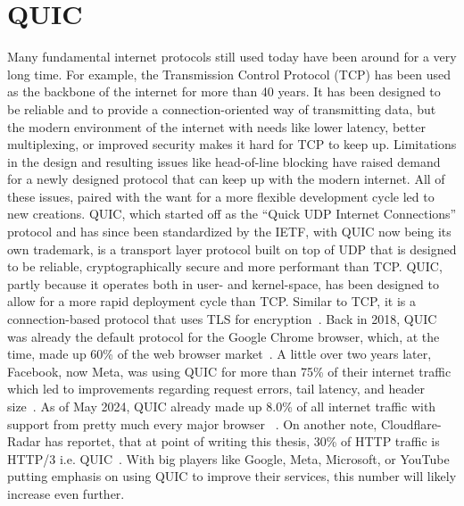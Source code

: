 \section{QUIC}\label{sec:quic_bg}
Many fundamental internet protocols still used today have been around for 
a very long time.
For example, the Transmission Control Protocol (TCP) has been used as the backbone
of the internet for more than 40 years.
It has been designed to be reliable and to provide a connection-oriented
way of transmitting data, but the modern environment of the internet with
needs like lower latency, better multiplexing, or improved security makes it 
hard for TCP to keep up.
Limitations in the design and resulting issues like head-of-line blocking
have raised demand for a newly designed protocol that can keep up with the
modern internet. %
All of these issues, paired with the want for a more flexible development cycle
led to new creations.
QUIC, which started off as the ``Quick UDP Internet Connections'' protocol and has 
since been standardized by the IETF, with QUIC now being its own trademark, is a 
transport layer protocol built on top of UDP that is designed to be reliable, 
cryptographically secure and more performant than TCP\@.
QUIC, partly because it operates both in user- and kernel-space, has been designed to allow for a 
more rapid deployment cycle than TCP\@.
Similar to TCP, it is a connection-based protocol that uses TLS for encryption~\parencite{quic-explained}.
Back in 2018, QUIC was already the default protocol for the Google Chrome browser, which,
at the time, made up 60\% of the web browser market~\parencite{google-quic-usage}.
A little over two years later, Facebook, now Meta, was using QUIC for more than 75\% of 
their internet traffic which led to improvements regarding
request errors, tail latency, and header size~\parencite{facebook-quic-usage}.
As of May 2024, QUIC already made up 8.0\% of all internet traffic %
with support from pretty much every major browser
~\parencite{internet-quic-usage, article-quic-usage}.
On another note, Cloudflare-Radar has reportet, that at point of writing this thesis, 
30\% of HTTP traffic is HTTP/3 i.e. QUIC~\parencite{cloudflare-radar}.
With big players like Google, Meta, Microsoft, or YouTube putting emphasis on
using QUIC to improve their services, this number will likely increase even further.


